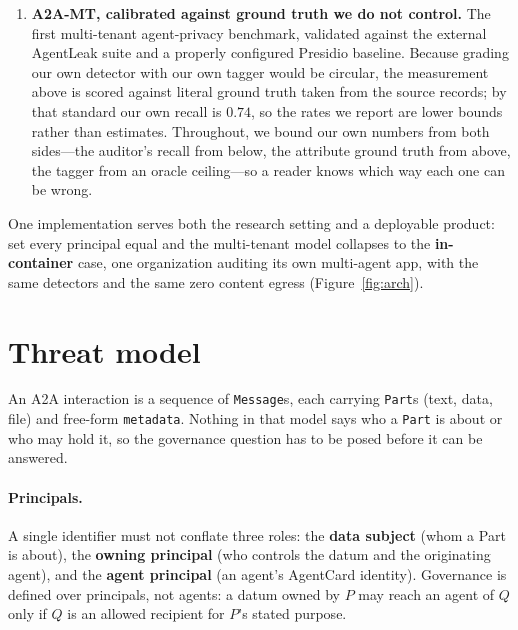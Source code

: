 \documentclass[sigconf,anonymous,review]{acmart}
\theoremstyle{acmplain}
\begin{document}
\begin{enumerate}
agent principal---and carries them in \texttt{Part.metadata}. It composes with
unmodified A2A, and it is the mechanism the two results above stand on: without it
there is nothing for a content-blind center to reason over.
\item \textbf{A2A-MT, calibrated against ground truth we do not control.} The first
multi-tenant agent-privacy benchmark, validated against the external AgentLeak suite
and a properly configured Presidio baseline. Because grading our own detector with our
own tagger would be circular, the measurement above is scored against literal ground
truth taken from the source records; by that standard our own recall is $0.74$, so the
rates we report are lower bounds rather than estimates. Throughout, we bound our own
numbers from both sides---the auditor's recall from below, the attribute ground
truth from above, the tagger from an oracle ceiling---so a reader knows which way
each one can be wrong.
\end{enumerate}
\noindent One implementation serves both the research setting and a deployable
product: set every principal equal and the multi-tenant model collapses to the
\textbf{in-container} case, one organization auditing its own multi-agent app,
with the same detectors and the same zero content egress (Figure~\ref{fig:arch}).



\section{Threat model}\label{sec:threat}
An A2A interaction is a sequence of \texttt{Message}s, each carrying
\texttt{Part}s (text, data, file) and free-form \texttt{metadata}. Nothing in that
model says who a \texttt{Part} is about or who may hold it, so the governance
question has to be posed before it can be answered.

\paragraph{Principals.} A single identifier must not conflate three roles: the
\textbf{data subject} (whom a Part is about), the \textbf{owning principal} (who
controls the datum and the originating agent), and the \textbf{agent principal} (an
agent's AgentCard identity). Governance is defined over principals, not agents: a
datum owned by $P$ may reach an agent of $Q$ only if $Q$ is an allowed recipient for
$P$'s stated purpose.
\end{document}
